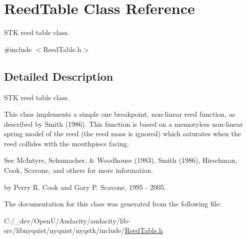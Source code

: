 \hypertarget{class_reed_table}{}\section{Reed\+Table Class Reference}
\label{class_reed_table}


S\+TK reed table class.  




{\ttfamily \#include $<$Reed\+Table.\+h$>$}



\subsection{Detailed Description}
S\+TK reed table class. 

This class implements a simple one breakpoint, non-\/linear reed function, as described by Smith (1986). This function is based on a memoryless non-\/linear spring model of the reed (the reed mass is ignored) which saturates when the reed collides with the mouthpiece facing.

See Mc\+Intyre, Schumacher, \& Woodhouse (1983), Smith (1986), Hirschman, Cook, Scavone, and others for more information.

by Perry R. Cook and Gary P. Scavone, 1995 -\/ 2005. 

The documentation for this class was generated from the following file\+:\begin{DoxyCompactItemize}
\item 
C\+:/\+\_\+dev/\+Open\+U/\+Audacity/audacity/lib-\/src/libnyquist/nyquist/nyqstk/include/\hyperlink{_reed_table_8h}{Reed\+Table.\+h}\end{DoxyCompactItemize}
